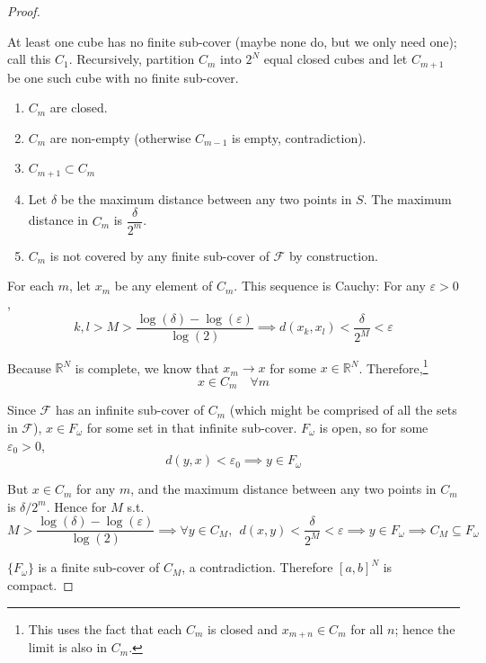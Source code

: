 \documentclass{article}
\theoremstyle{mythm}
\theoremstyle{mydef}
\begin{document}
\begin{proof}
\begin{figure}[H]
  \end{figure}

  At least one cube has no finite sub-cover (maybe none do, but we only need one); call this $C_1$. Recursively, partition $C_m$ into $2^N$ equal closed cubes and let $C_{m + 1}$ be one such cube with no finite sub-cover.
  \begin{enumerate}
    \item $C_m$ are closed.

    \item $C_m$ are non-empty (otherwise $C_{m - 1}$ is empty, contradiction).

    \item $C_{m + 1} \subset C_m$

    \item Let $\delta$ be the maximum distance between any two points in $S$. The maximum distance in $C_m$ is $\dfrac{\delta}{2^m}$.

    \item $C_m$ is not covered by any finite sub-cover of $\mathcal{F}$ by construction.
  \end{enumerate}

  For each $m$, let $x_m$ be any element of $C_m$. This sequence is Cauchy: For any $\varepsilon > 0$,
  \[
    k, l > M > \dfrac{\log(\delta) - \log(\varepsilon)}{\log(2)}
    \implies
    d(x_k, x_l)
    <
    \dfrac{\delta}{2^M}
    <
    \varepsilon
  \]

  Because $\mathbb{R}^N$ is complete, we know that $x_m \to x$ for some $x \in \mathbb{R}^N$. Therefore,\footnote{This uses the fact that each $C_m$ is closed and $x_{m + n} \in C_m$ for all $n$; hence the limit is also in $C_m$.}
  \[
    x \in C_m
    \quad
    \forall m
  \]

  Since $\mathcal{F}$ has an infinite sub-cover of $C_m$ (which might be comprised of all the sets in $\mathcal{F}$), $x \in F_\omega$ for some set in that infinite sub-cover. $F_\omega$ is open, so for some $\varepsilon_0 > 0$,
  \[
    d(y, x) < \varepsilon_0 \implies y \in F_\omega
  \]

  But $x \in C_m$ for any $m$, and the maximum distance between any two points in $C_m$ is $\delta / 2^m$. Hence for $M$ s.t.
  \[
    M > \dfrac{\log(\delta) - \log(\varepsilon)}{\log(2)}
    \implies
    \forall y \in C_M, ~~ d(x, y) < \frac{\delta}{2^M} < \varepsilon
    \implies
    y \in F_\omega
    \implies
    C_M \subseteq F_\omega
  \]

  $\{F_\omega\}$ is a finite sub-cover of $C_M$, a contradiction. Therefore $[a, b]^N$ is compact.
\end{proof}
\end{document}
